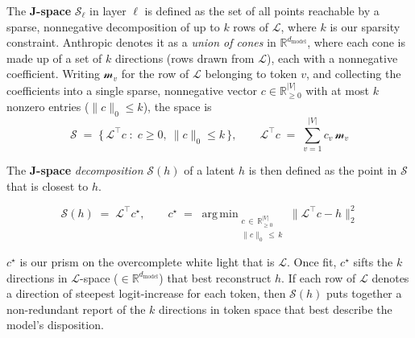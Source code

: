 \documentclass{article}
\newcommand{\jlens}{\mathscr{L}}
\newcommand{\jspace}{\mathscr{S}}
\newcommand{\dmodel}{d_{\text{model}}}
\DeclareMathOperator*{\argmin}{arg\,min}
\begin{document}
The \textbf{J-space} \(\jspace_\ell\) in layer \(\ell\) is defined as the set of all points reachable by a sparse, nonnegative decomposition of up to \(k\) rows of \(\jlens\), where \(k\) is our sparsity constraint. Anthropic denotes it as a \textit{union of cones} in \(\mathbb{R}^{\dmodel}\), where each cone is made up of a set of \(k\) directions (rows drawn from \(\jlens\)), each with a nonnegative coefficient. Writing \(\mathscr{m}_{v}\) for the row of \(\jlens\) belonging to token \(v\), and collecting the coefficients into a single sparse, nonnegative vector \(c \in \mathbb{R}^{|V|}_{\ge 0}\) with at most \(k\) nonzero entries (\(\|c\|_0 \le k\)), the space is
\[ \jspace \;=\; \bigl\{\, \jlens^{\!\top} c \;:\; c \ge 0,\ \|c\|_0 \le k \,\bigr\}, \qquad \jlens^{\!\top} c \;=\; \sum_{v=1}^{|V|} c_v\, \mathscr{m}_{v} \]

The \textbf{J-space} \textit{decomposition} \(\jspace(h)\) of a latent \(h\) is then defined as the point in \(\jspace\) that is closest to \(h\).

\[ \jspace(h) \;=\; \jlens^{\!\top} c^\star, \qquad c^\star \;=\; \argmin_{\substack{c \,\in\, \mathbb{R}^{|V|}_{\ge 0} \\ \|c\|_0 \,\le\, k}} \bigl\| \jlens^{\!\top} c - h \bigr\|_2^2  \]

\(c^\star\) is our prism on the overcomplete white light that is \(\jlens\). Once fit, \(c^\star\) sifts the \(k\) directions in \(\jlens\)-space (\(\in \mathbb{R}^{\dmodel}\)) that best reconstruct \(h\). If each row of \(\jlens\) denotes a direction of steepest logit-increase for each token, then \(\jspace(h)\) puts together a non-redundant report of the \(k\) directions in token space that best describe the model's disposition.
\end{document}
